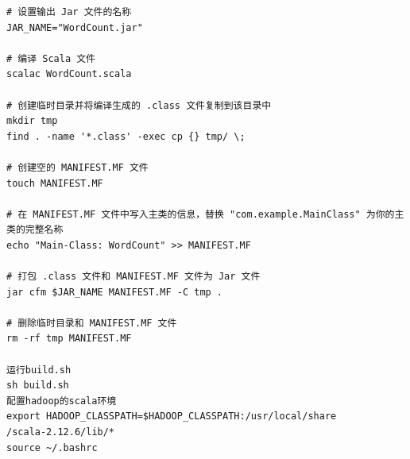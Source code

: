 \documentclass{article}
\begin{document}
\begin{enumerate}
\begin{lstlisting}
# 设置输出 Jar 文件的名称
JAR_NAME="WordCount.jar"

# 编译 Scala 文件
scalac WordCount.scala

# 创建临时目录并将编译生成的 .class 文件复制到该目录中
mkdir tmp
find . -name '*.class' -exec cp {} tmp/ \;

# 创建空的 MANIFEST.MF 文件
touch MANIFEST.MF

# 在 MANIFEST.MF 文件中写入主类的信息，替换 "com.example.MainClass" 为你的主类的完整名称
echo "Main-Class: WordCount" >> MANIFEST.MF

# 打包 .class 文件和 MANIFEST.MF 文件为 Jar 文件
jar cfm $JAR_NAME MANIFEST.MF -C tmp .

# 删除临时目录和 MANIFEST.MF 文件
rm -rf tmp MANIFEST.MF

运行build.sh
sh build.sh
配置hadoop的scala环境
export HADOOP_CLASSPATH=$HADOOP_CLASSPATH:/usr/local/share
/scala-2.12.6/lib/*
source ~/.bashrc


\end{lstlisting}
\end{enumerate}
\end{document}
